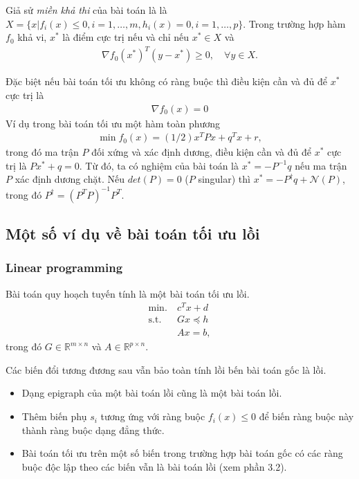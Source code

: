 \documentclass{book}
\begin{document}
Giả sử \emph{miền khả thi} của bài toán là là $X = \{ x | f_i(x) \leq 0, i=1, \ldots, m, h_i(x) = 0, i = 1, \ldots, p \}$. Trong trường hợp hàm $f_0$ khả vi,
$x^*$ là điểm cực trị nếu và chỉ nếu $x^* \in X$ và 
\begin{align*}
\nabla f_0(x^*)^T (y - x^*) \geq 0, \quad \forall y \in X.
\end{align*}


Đặc biệt nếu bài toán tối ưu không có ràng buộc thì điều kiện cần và đủ để $x^*$ cực trị là
\begin{align*}
\nabla f_0(x) = 0
\end{align*}
Ví dụ trong bài toán tối ưu một hàm toàn phương 
\begin{align*}
\min f_0(x) = (1/2) x^T Px + q^T x + r,
\end{align*}
trong đó ma trận $P$ đối xứng và xác định dương, điều kiện cần và đủ để $x^*$ cực trị  là $Px^* + q = 0$.
Từ đó, ta có nghiệm của bài toán là $x^* = -P^{-1}q$ nếu ma trận $P$ xác định dương chặt. 
Nếu $det(P) = 0$ ($P$ singular) thì $x^* = -P^{\dagger} q + \mathcal{N} (P)$, trong đó  $P^\dagger = (P^T P)^{-1} P^T$.

\subsection{Một số ví dụ về bài toán tối ưu lồi}
\subsubsection*{Linear programming}
Bài toán quy hoạch tuyến tính là một bài toán tối ưu lồi.
\begin{align*}
\mathrm{min.}~ & c^T x + d \\
\mathrm{s.t.}~ & Gx \preceq h \\
			& A x = b,
\end{align*}
trong đó $G \in \mathbb{R}^{m \times n}$ và  $A \in \mathbb{R}^{p \times n}$.

Các biến đổi tương đương sau vẫn bảo toàn tính lồi bến bài toán gốc là lồi.
\begin{itemize}
\item Dạng epigraph của một bài toán lồi cũng là một bài toán lồi.
\item Thêm biến phụ $s_i$ tương ứng với ràng buộc $f_i(x) \leq 0$ để biến ràng buộc này thành ràng buộc dạng đẳng thức.
\item Bài toán tối ưu trên một số biến trong trường hợp bài toán gốc có các ràng buộc độc lập theo các biến vẫn là bài toán lồi (xem phần 3.2).
\end{itemize}
\end{document}
